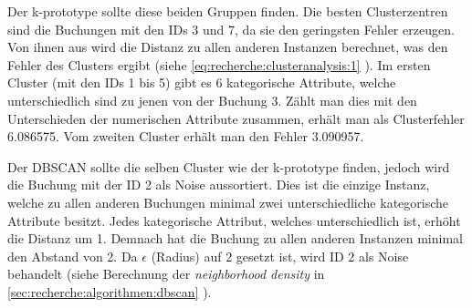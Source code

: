 Der k-prototype sollte diese beiden Gruppen finden. Die besten Clusterzentren sind die Buchungen mit den IDs 3 und 7, da sie den geringsten Fehler erzeugen. Von ihnen aus wird die Distanz zu allen anderen Instanzen berechnet, was den Fehler des Clusters ergibt (siehe \cref{eq:recherche:clusteranalysis:1} ). Im ersten Cluster (mit den IDs 1 bis 5) gibt es 6 kategorische Attribute, welche unterschiedlich sind zu jenen von der Buchung 3. Zählt man dies mit den Unterschieden der numerischen Attribute zusammen, erhält man als Clusterfehler 6.086575. Vom zweiten Cluster erhält man den Fehler 3.090957.

Der DBSCAN sollte die selben Cluster wie der k-prototype finden, jedoch wird die Buchung mit der ID 2 als Noise aussortiert. Dies ist die einzige Instanz, welche zu allen anderen Buchungen minimal zwei unterschiedliche kategorische Attribute besitzt. Jedes kategorische Attribut, welches unterschiedlich ist, erhöht die Distanz um 1. Demnach hat die Buchung zu allen anderen Instanzen minimal den Abstand von 2. Da $\epsilon$ (Radius) auf 2 gesetzt ist, wird ID 2 als Noise behandelt (siehe Berechnung der \textit{neighborhood density} in \cref{sec:recherche:algorithmen:dbscan} ).

